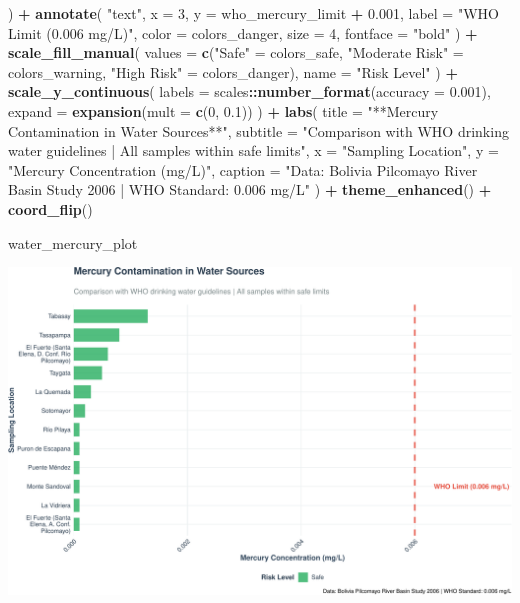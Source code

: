 \documentclass[
]{article}
\newenvironment{Shaded}{\begin{snugshade}}{\end{snugshade}}
\newcommand{\AttributeTok}[1]{\textcolor[rgb]{0.13,0.29,0.53}{#1}}
\newcommand{\DecValTok}[1]{\textcolor[rgb]{0.00,0.00,0.81}{#1}}
\newcommand{\FloatTok}[1]{\textcolor[rgb]{0.00,0.00,0.81}{#1}}
\newcommand{\FunctionTok}[1]{\textcolor[rgb]{0.13,0.29,0.53}{\textbf{#1}}}
\newcommand{\NormalTok}[1]{#1}
\newcommand{\OtherTok}[1]{\textcolor[rgb]{0.56,0.35,0.01}{#1}}
\newcommand{\SpecialCharTok}[1]{\textcolor[rgb]{0.81,0.36,0.00}{\textbf{#1}}}
\newcommand{\StringTok}[1]{\textcolor[rgb]{0.31,0.60,0.02}{#1}}
\begin{document}
\begin{Shaded}
\begin{Highlighting}[]
\NormalTok{  ) }\SpecialCharTok{+}
  \FunctionTok{annotate}\NormalTok{(}
    \StringTok{"text"}\NormalTok{,}
    \AttributeTok{x =} \DecValTok{3}\NormalTok{, }\AttributeTok{y =}\NormalTok{ who\_mercury\_limit }\SpecialCharTok{+} \FloatTok{0.001}\NormalTok{,}
    \AttributeTok{label =} \StringTok{"WHO Limit (0.006 mg/L)"}\NormalTok{,}
    \AttributeTok{color =}\NormalTok{ colors\_danger,}
    \AttributeTok{size =} \DecValTok{4}\NormalTok{,}
    \AttributeTok{fontface =} \StringTok{"bold"}
\NormalTok{  ) }\SpecialCharTok{+}
  \FunctionTok{scale\_fill\_manual}\NormalTok{(}
    \AttributeTok{values =} \FunctionTok{c}\NormalTok{(}\StringTok{"Safe"} \OtherTok{=}\NormalTok{ colors\_safe, }
               \StringTok{"Moderate Risk"} \OtherTok{=}\NormalTok{ colors\_warning, }
               \StringTok{"High Risk"} \OtherTok{=}\NormalTok{ colors\_danger),}
    \AttributeTok{name =} \StringTok{"Risk Level"}
\NormalTok{  ) }\SpecialCharTok{+}
  \FunctionTok{scale\_y\_continuous}\NormalTok{(}
    \AttributeTok{labels =}\NormalTok{ scales}\SpecialCharTok{::}\FunctionTok{number\_format}\NormalTok{(}\AttributeTok{accuracy =} \FloatTok{0.001}\NormalTok{),}
    \AttributeTok{expand =} \FunctionTok{expansion}\NormalTok{(}\AttributeTok{mult =} \FunctionTok{c}\NormalTok{(}\DecValTok{0}\NormalTok{, }\FloatTok{0.1}\NormalTok{))}
\NormalTok{  ) }\SpecialCharTok{+}
  \FunctionTok{labs}\NormalTok{(}
    \AttributeTok{title =} \StringTok{"**Mercury Contamination in Water Sources**"}\NormalTok{,}
    \AttributeTok{subtitle =} \StringTok{"Comparison with WHO drinking water guidelines | All samples within safe limits"}\NormalTok{,}
    \AttributeTok{x =} \StringTok{"Sampling Location"}\NormalTok{,}
    \AttributeTok{y =} \StringTok{"Mercury Concentration (mg/L)"}\NormalTok{,}
    \AttributeTok{caption =} \StringTok{"Data: Bolivia Pilcomayo River Basin Study 2006 | WHO Standard: 0.006 mg/L"}
\NormalTok{  ) }\SpecialCharTok{+}
  \FunctionTok{theme\_enhanced}\NormalTok{() }\SpecialCharTok{+}
  \FunctionTok{coord\_flip}\NormalTok{()}

\NormalTok{water\_mercury\_plot}
\end{Highlighting}
\end{Shaded}

\includegraphics{WHO_standards_pdf_02_files/figure-latex/mercury-water-1.pdf}
\end{document}
